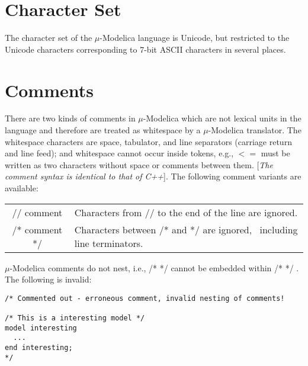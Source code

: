 \documentclass[11pt,a4paper,notitlepage]{report}
\begin{document}
\section{Character Set}

The character set of the $\mu$-Modelica language is Unicode, but restricted to the Unicode characters corresponding to 7-bit ASCII characters in several places.

\section{Comments}

There are two kinds of comments in $\mu$-Modelica which are not lexical units in the language and therefore are treated as whitespace by a $\mu$-Modelica translator. The whitespace characters are space, tabulator, and line separators (carriage return and line feed); and whitespace cannot occur inside tokens, e.g., $<=$ must be written as two characters without space or comments between them. [\emph{The comment syntax is identical to that of C++}]. The following comment variants are available:

\begin{center}
\begin{tabular}{cp{3in}}
	// comment & Characters from // to the end of the line are ignored. \\	
	/* comment */ & Characters between /* and */ are ignored, \ 
					including line terminators.  \\
\end{tabular}
\label{tab:comments}
\end{center}

$\mu$-Modelica comments do not nest, i.e., /* */ cannot be embedded within /* */ . The following is invalid:

\begin{verbatim}
/* Commented out - erroneous comment, invalid nesting of comments!

/* This is a interesting model */
model interesting
  ...
end interesting;
*/
\end{verbatim}

%
\end{document}
